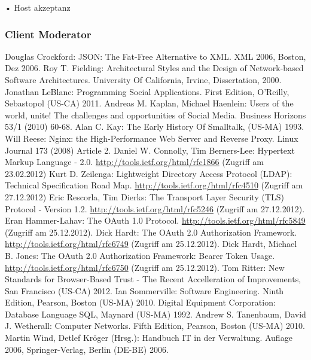 \documentclass[12pt,a4paper,pointednumbers,abstracton]{scrartcl}
\begin{document}
• Host akzeptanz

\subsubsection{Client Moderator}
\label{sec:oauth-infrz/moderator}

\newpage
{}
\begin{raggedright}%
\begin{thebibliography}{XXXXXXXX}
	 Douglas Crockford: JSON: The Fat-Free Alternative to XML. XML 2006, Boston, Dez 2006.
	Roy T. Fielding: Architectural Styles and the Design of Network-based Software Architectures. University Of California, Irvine, Dissertation, 2000.
	 Jonathan LeBlanc: Programming Social Applications. First Edition, O'Reilly, Sebastopol (US-CA) 2011.
	 Andreas M. Kaplan, Michael Haenlein: Users of the world, unite! The challenges and opportunities of Social Media. Business Horizons 53/1 (2010) 60-68.
	 Alan C. Kay: The Early History Of Smalltalk, (US-MA) 1993.
	 Will Reese:  Nginx: the High-Performance Web Server and Reverse Proxy. Linux Journal 173 (2008) Article 2.
	 Daniel W. Connolly, Tim Berners-Lee: Hypertext Markup Language - 2.0. \url{http://tools.ietf.org/html/rfc1866} (Zugriff am 23.02.2012)
	 Kurt D. Zeilenga: Lightweight Directory Access Protocol (LDAP): Technical Specification Road Map. \url{http://tools.ietf.org/html/rfc4510} (Zugriff am 27.12.2012)
	 Eric Rescorla, Tim Dierks: The Transport Layer Security (TLS) Protocol - Version 1.2. \url{http://tools.ietf.org/html/rfc5246} (Zugriff am 27.12.2012).
	 Eran Hammer-Lahav: The OAuth 1.0 Protocol. \url{http://tools.ietf.org/html/rfc5849} (Zugriff am 25.12.2012).
	 Dick Hardt: The OAuth 2.0 Authorization Framework. \url{http://tools.ietf.org/html/rfc6749} (Zugriff am 25.12.2012).
	 Dick Hardt, Michael B. Jones: The OAuth 2.0 Authorization Framework: Bearer Token Usage. \url{http://tools.ietf.org/html/rfc6750} (Zugriff am 25.12.2012).
	 Tom Ritter: New Standards for Browser-Based Trust - The Recent Accelleration of Improvements, San Francisco (US-CA) 2012.
	 Ian Sommerville: Software Engineering. Ninth Edition, Pearson, Boston (US-MA) 2010.
	 Digital Equipment Corporation: Database Language SQL, Maynard (US-MA) 1992.
	 Andrew S. Tanenbaum, David J. Wetherall: Computer Networks. Fifth Edition, Pearson, Boston (US-MA) 2010.
	 Martin Wind, Detlef Kröger (Hrsg.): Handbuch IT in der Verwaltung. Auflage 2006, Springer-Verlag, Berlin (DE-BE) 2006.
\end{thebibliography}
\end{raggedright}
\end{document}
